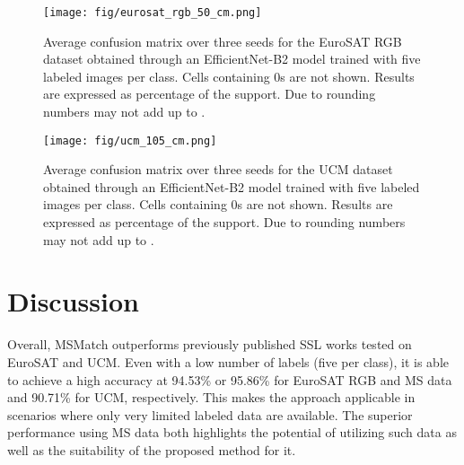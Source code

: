 \documentclass[journal]{IEEEtran}
\begin{document}
\begin{figure}[ht]
\centering
\texttt{[image: fig/eurosat\_rgb\_50\_cm.png]}
\caption{Average confusion matrix over three seeds for the EuroSAT RGB dataset obtained through an EfficientNet-B2 model trained with five labeled images per class. Cells containing 0s are not shown. Results are expressed as percentage of the support. Due to rounding numbers may not add up to .}
\label{fig: eurosat_confusion}
\end{figure}

\begin{figure}[ht]
\centering
\texttt{[image: fig/ucm\_105\_cm.png]}
\caption{Average confusion matrix over three seeds for the UCM dataset obtained through an EfficientNet-B2 model trained with five labeled images per class. Cells containing 0s are not shown. Results are expressed as percentage of the support. Due to rounding numbers may not add up to .}
\label{fig: ucm_confusion}
\end{figure}

\section{Discussion}
Overall, MSMatch outperforms previously published SSL works tested on EuroSAT and UCM. Even with a low number of labels (five per class), it is able to achieve a high accuracy at 94.53\% or 95.86\% for EuroSAT RGB and MS data and 90.71\% for UCM, respectively. This makes the approach applicable in scenarios where only very limited labeled data are available. The superior performance using MS data both highlights the potential of utilizing such data as well as the suitability of the proposed method for it. \\
\end{document}
